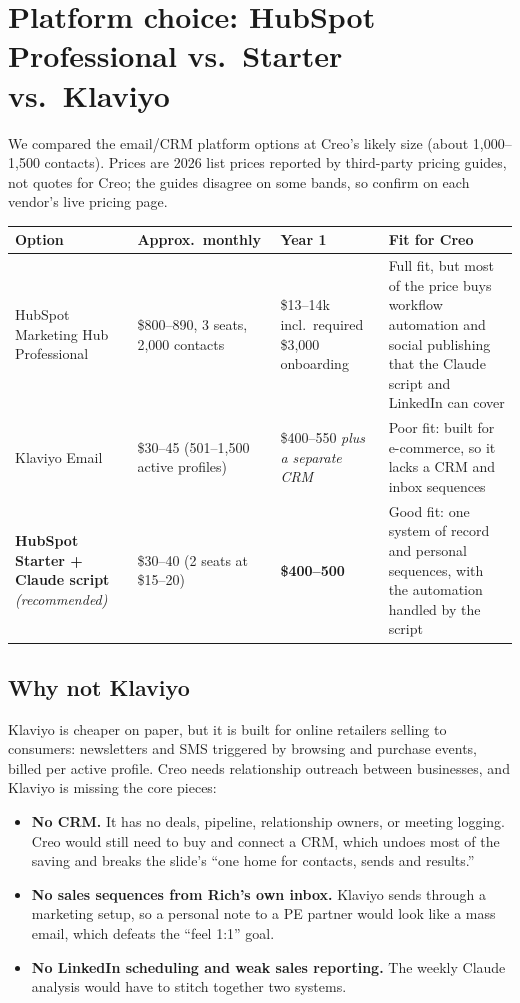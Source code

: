 \documentclass[11pt]{article}
\begin{document}
\section{Platform choice: HubSpot Professional vs.\ Starter vs.\ Klaviyo}\label{sec:platform}
We compared the email/CRM platform options at Creo's likely size (about 1{,}000--1{,}500
contacts). Prices are 2026 list prices reported by third-party pricing guides, not quotes for
Creo; the guides disagree on some bands, so confirm on each vendor's live pricing page.

\begin{center}
\renewcommand{\arraystretch}{1.3}\small
\begin{tabular}{L{3.6cm} L{2.6cm} L{2.4cm} L{5.2cm}}
\toprule
\textbf{Option} & \textbf{Approx.\ monthly} & \textbf{Year 1} & \textbf{Fit for Creo} \\
\midrule
HubSpot Marketing Hub Professional & \$800--890, 3 seats, 2{,}000 contacts &
\$13--14k incl.\ required \$3{,}000 onboarding & Full fit, but most of the price buys workflow
automation and social publishing that the Claude script and LinkedIn can cover \\
\addlinespace
Klaviyo Email & \$30--45 (501--1{,}500 active profiles) & \$400--550 \emph{plus a separate CRM} &
Poor fit: built for e-commerce, so it lacks a CRM and inbox sequences \\
\addlinespace
\textbf{HubSpot Starter + Claude script} \emph{(recommended)} & \$30--40 (2 seats at
\$15--20) & \textbf{\$400--500} & Good fit: one system of record and personal sequences, with
the automation handled by the script \\
\bottomrule
\end{tabular}
\end{center}

\subsection{Why not Klaviyo}
Klaviyo is cheaper on paper, but it is built for online retailers selling to consumers:
newsletters and SMS triggered by browsing and purchase events, billed per active profile. Creo
needs relationship outreach between businesses, and Klaviyo is missing the core pieces:
\begin{itemize}
  \item \textbf{No CRM.} It has no deals, pipeline, relationship owners, or meeting logging. Creo
  would still need to buy and connect a CRM, which undoes most of the saving and breaks the
  slide's ``one home for contacts, sends and results.''
  \item \textbf{No sales sequences from Rich's own inbox.} Klaviyo sends through a marketing
  setup, so a personal note to a PE partner would look like a mass email, which defeats the
  ``feel 1:1'' goal.
  \item \textbf{No LinkedIn scheduling and weak sales reporting.} The weekly Claude analysis would
  have to stitch together two systems.
\end{itemize}
\end{document}
